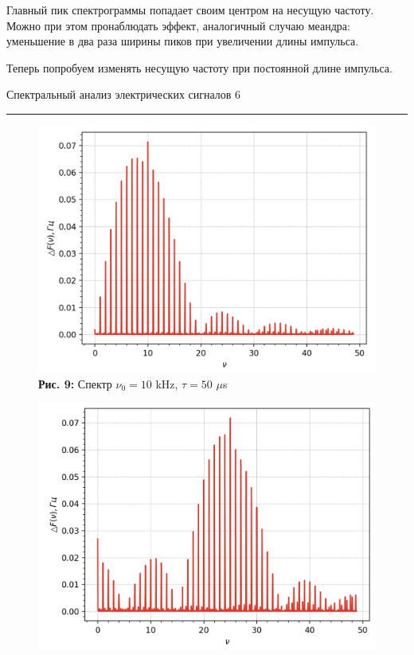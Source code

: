 \documentclass[12pt,a4paper]{scrartcl}
\begin{document}
	Главный пик спектрограммы попадает своим центром на несущую частоту. Можно при этом пронаблюдать эффект, аналогичный случаю меандра: уменьшение в два раза ширины пиков при увеличении длины импульса.
	
	Теперь попробуем изменять несущую частоту при постоянной длине импульса.
	
	
	\newpage
	
	
	\begin{flushleft}
		\footnotesize{Спектральный анализ электрических сигналов} \hspace{\fill} \footnotesize{6}
		\\[-0.3cm]\noindent\rule{\textwidth}{0.3pt}
	\end{flushleft}
	
	\begin{figure}[h]
		\begin{minipage}{0.5\linewidth}
			\begin{center}
				\includegraphics[scale=0.18]{PIC_9.png}
				\\\textbf{Рис. 9:} Спектр $\nu_0 = 10$ kHz, $\tau = 50$ $\mu$s
			\end{center}
		\end{minipage}
		\begin{minipage}{0.5\linewidth}
			\begin{center}
				\includegraphics[scale=0.18]{PIC_10.png}

\end{center}
\end{minipage}
\end{figure}
\end{document}
